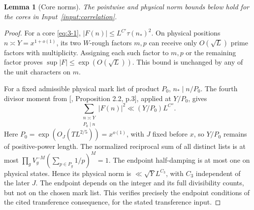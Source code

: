 \documentclass[11pt]{article}
\newtheorem{lemma}[theorem]{Lemma}
\theoremstyle{definition}
\theoremstyle{definition}
\begin{document}
\begin{lemma}[Core norms]\label{lem:core-norms}
The pointwise and physical norm bounds below hold for the cores in Input~\ref{input:correlation}.
\end{lemma}
\begin{proof}
For a core \eqref{eq:3-1}, \(|F(n)|\le L^{C'}\tau(n_*)^2\). On physical positions \(n\asymp Y=x^{1+o(1)}\), its two \(W\)-rough factors \(m,p\) can receive only \(O(\sqrt L)\) prime factors with multiplicity. Assigning each such factor to \(m,p\) or the remaining factor proves \(\sup|F|\le\exp(O(\sqrt L))\). This bound is unchanged by any of the unit characters on \(m\).

For a fixed admissible physical mark list of product \(P_0\), \(n_*\mid n/P_0\). The fourth divisor moment from [, Proposition 2.2, p.3], applied at \(Y/P_0\), gives
\begin{equation*}
\sum_{\substack{n\asymp Y\\P_0\mid n}}|F(n)|^2
 \ll(Y/P_0)L^{C''}.
\end{equation*}
Here \(P_0=\exp(O_J(TL^{2/5}))=x^{o(1)}\), with \(J\) fixed before \(x\), so \(Y/P_0\) remains of positive-power length. The normalized reciprocal sum of all distinct lists is at most
\(\prod_g V_g^{-M}(\sum_{p\in P_g}1/p)^M=1\).
The endpoint half-damping is at most one on physical states. Hence its physical norm is \(\ll\sqrt YL^{C_3}\), with \(C_3\) independent of the later \(J\). The endpoint depends on the integer and its full divisibility counts, but not on the chosen mark list. This verifies precisely the endpoint conditions of the cited transference consequence, for the stated transference input.

\end{proof}
\begingroup\small
\setlength{\tabcolsep}{3pt}
\end{document}
